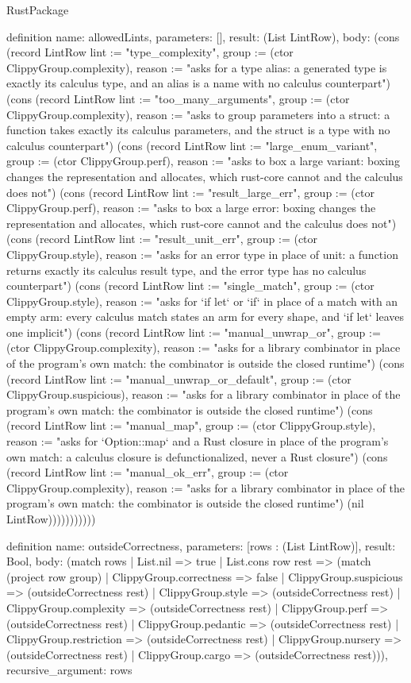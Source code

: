 \begin{lexlean}{RustPackage}
\begin{semanticmodule}
definition{
  name: allowedLints,
  parameters: [],
  result: (List LintRow),
  body: (cons (record LintRow {lint := "type_complexity", group := (ctor ClippyGroup.complexity), reason := "asks for a type alias: a generated type is exactly its calculus type, and an alias is a name with no calculus counterpart"}) (cons (record LintRow {lint := "too_many_arguments", group := (ctor ClippyGroup.complexity), reason := "asks to group parameters into a struct: a function takes exactly its calculus parameters, and the struct is a type with no calculus counterpart"}) (cons (record LintRow {lint := "large_enum_variant", group := (ctor ClippyGroup.perf), reason := "asks to box a large variant: boxing changes the representation and allocates, which rust-core cannot and the calculus does not"}) (cons (record LintRow {lint := "result_large_err", group := (ctor ClippyGroup.perf), reason := "asks to box a large error: boxing changes the representation and allocates, which rust-core cannot and the calculus does not"}) (cons (record LintRow {lint := "result_unit_err", group := (ctor ClippyGroup.style), reason := "asks for an error type in place of unit: a function returns exactly its calculus result type, and the error type has no calculus counterpart"}) (cons (record LintRow {lint := "single_match", group := (ctor ClippyGroup.style), reason := "asks for `if let` or `if` in place of a match with an empty arm: every calculus match states an arm for every shape, and `if let` leaves one implicit"}) (cons (record LintRow {lint := "manual_unwrap_or", group := (ctor ClippyGroup.complexity), reason := "asks for a library combinator in place of the program's own match: the combinator is outside the closed runtime"}) (cons (record LintRow {lint := "manual_unwrap_or_default", group := (ctor ClippyGroup.suspicious), reason := "asks for a library combinator in place of the program's own match: the combinator is outside the closed runtime"}) (cons (record LintRow {lint := "manual_map", group := (ctor ClippyGroup.style), reason := "asks for `Option::map` and a Rust closure in place of the program's own match: a calculus closure is defunctionalized, never a Rust closure"}) (cons (record LintRow {lint := "manual_ok_err", group := (ctor ClippyGroup.complexity), reason := "asks for a library combinator in place of the program's own match: the combinator is outside the closed runtime"}) (nil LintRow)))))))))))
}

definition{
  name: outsideCorrectness,
  parameters: [rows : (List LintRow)],
  result: Bool,
  body: (match rows
    | List.nil => true
    | List.cons row rest => (match (project row group)
      | ClippyGroup.correctness => false
      | ClippyGroup.suspicious => (outsideCorrectness rest)
      | ClippyGroup.style => (outsideCorrectness rest)
      | ClippyGroup.complexity => (outsideCorrectness rest)
      | ClippyGroup.perf => (outsideCorrectness rest)
      | ClippyGroup.pedantic => (outsideCorrectness rest)
      | ClippyGroup.restriction => (outsideCorrectness rest)
      | ClippyGroup.nursery => (outsideCorrectness rest)
      | ClippyGroup.cargo => (outsideCorrectness rest))),
  recursive_argument: rows
}


\end{semanticmodule}
\end{lexlean}
